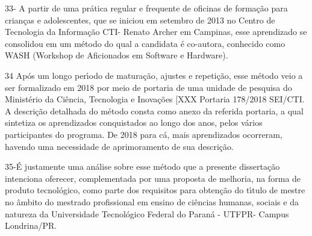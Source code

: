 \documentclass[
12pt,		%
openright,	%
twoside,  %
a4paper,			%
chapter=TITLE,		%
english,			%
french,				%
spanish,			%
brazil				%
]{USPSC-classe/USPSC_RedarTex}
\begin{document}
33- A partir de uma pr\'atica regular e frequente de oficinas de forma\c{c}\~ao para  crian\c{c}as e adolescentes, que se iniciou em setembro de 2013 no Centro de Tecnologia da Informa\c{c}\~ao CTI- Renato Archer em Campinas, esse aprendizado se consolidou em um m\'etodo do qual a candidata \'e co-autora, conhecido como WASH (Workshop de Aficionados em Software e Hardware).








34 Ap\'os um longo per\'{\i}odo de matura\c{c}\~ao, ajustes e repeti\c{c}\~ao, esse m\'etodo veio a ser formalizado em 2018 por meio de portaria de uma unidade de pesquisa do Minist\'erio da Ci\^encia, Tecnologia e Inova\c{c}\~oes [XXX Portaria 178/2018 SEI/CTI. A descri\c{c}\~ao detalhada do m\'etodo consta como anexo da referida portaria, a qual sintetiza os aprendizados conquistados ao longo dos anos, pelos v\'arios participantes do programa. De 2018 para c\'a, mais aprendizados ocorreram, havendo uma necessidade de aprimoramento de sua descri\c{c}\~ao.








35-\'E justamente uma an\'alise sobre esse m\'etodo que a presente disserta\c{c}\~ao intenciona oferecer, complementada por uma proposta de melhoria, na forma de produto tecnol\'ogico, como parte dos requisitos para obten\c{c}\~ao do t\'{\i}tulo de mestre no \^ambito do mestrado profissional em ensino de ci\^encias humanas, sociais e da natureza da Universidade  Tecnol\'ogico  Federal do Paran\'a - UTFPR- Campus Londrina/PR.
\end{document}
